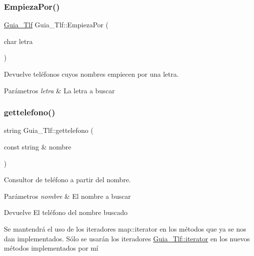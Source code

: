 \subsubsection{\texorpdfstring{Empieza\+Por()}{EmpiezaPor()}}
{\footnotesize\ttfamily \hyperlink{classGuia__Tlf}{Guia\+\_\+\+Tlf} Guia\+\_\+\+Tlf\+::\+Empieza\+Por (\begin{DoxyParamCaption}\item[{char}]{letra }\end{DoxyParamCaption})\hspace{0.3cm}{\ttfamily [inline]}}



Devuelve teléfonos cuyos nombres empiecen por una letra. 


\begin{DoxyParams}{Parámetros}
{\em letra} & La letra a buscar \\
\hline
\end{DoxyParams}
\mbox{\label{classGuia__Tlf_a18593e3cf273db1a540cba69f87fd637}} 
\subsubsection{\texorpdfstring{gettelefono()}{gettelefono()}}
{\footnotesize\ttfamily string Guia\+\_\+\+Tlf\+::gettelefono (\begin{DoxyParamCaption}\item[{const string \&}]{nombre }\end{DoxyParamCaption})\hspace{0.3cm}{\ttfamily [inline]}}



Consultor de teléfono a partir del nombre. 


\begin{DoxyParams}{Parámetros}
{\em nombre} & El nombre a buscar \\
\hline
\end{DoxyParams}
\begin{DoxyReturn}{Devuelve}
El teléfono del nombre buscado
\end{DoxyReturn}
Se mantendrá el uso de los iteradores map\+::iterator en los métodos que ya se nos dan implementados. Sólo se usarán los iteradores \hyperlink{classGuia__Tlf_1_1iterator}{Guia\+\_\+\+Tlf\+::iterator} en los nuevos métodos implementados por mí \mbox{\label{classGuia__Tlf_a8e712d6b87456d4cdb3c0c65adfb0262}} 
